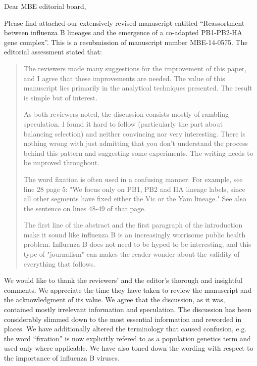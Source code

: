 \documentclass[11pt,oneside,letterpaper]{article}
\begin{document}

Dear MBE editorial board,

Please find attached our extensively revised manuscript entitled ``Reassortment between influenza B lineages and the emergence of a co-adapted PB1-PB2-HA gene complex''.  This is a resubmission of manuscript number MBE-14-0575. The editorial assessment stated that:

\begin{quote}
The reviewers made many suggestions for the improvement of this paper, and I agree that these improvements are needed. 
The value of this manuscript lies primarily in the analytical techniques presented. 
The result is simple but of interest.

As both reviewers noted, the discussion consists mostly of rambling speculation. 
I found it hard to follow (particularly the part about balancing selection) and neither convincing nor very interesting. 
There is nothing wrong with just admitting that you don't understand the process behind this pattern and suggesting some experiments. 
The writing needs to be improved throughout.

The word fixation is often used in a confusing manner. 
For example, see line 28 page 5: "We focus only on PB1, PB2 and HA lineage labels, since all other segments have fixed either the Vic or the Yam lineage." 
See also the sentence on lines 48-49 of that page.

The first line of the abstract and the first paragraph of the introduction make it sound like influenza B is an increasingly worrisome public health problem. 
Influenza B does not need to be hyped to be interesting, and this type of "journalism" can makes the reader wonder about the validity of everything that follows.
\end{quote}

We would like to thank the reviewers' and the editor's thorough and insightful comments.
We appreciate the time they have taken to review the manuscript and the acknowledgment of its value.
We agree that the discussion, as it was, contained mostly irrelevant information and speculation.
The discussion has been considerably slimmed down to the most essential information and reworded in places.
We have additionally altered the terminology that caused confusion, e.g. the word ``fixation'' is now explicitly refered to as a population genetics term and used only where applicable.
We have also toned down the wording with respect to the importance of influenza B viruses.
\end{document}
